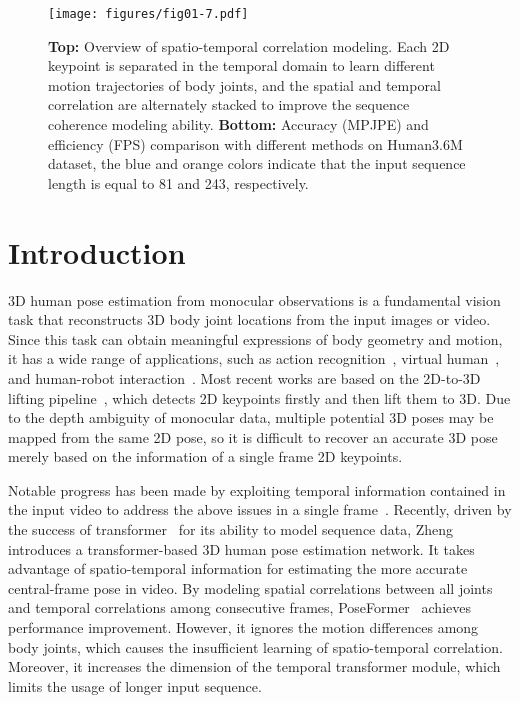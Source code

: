\documentclass[10pt,twocolumn,letterpaper]{article}
\begin{document}
	\begin{figure}[htp]
		\centering
\texttt{[image: figures/fig01-7.pdf]}
		\vspace{-0.6cm}
		\caption{
			\textbf{Top:} Overview of spatio-temporal correlation modeling. Each 2D keypoint is separated in the temporal domain to learn different motion trajectories of body joints, and the spatial and temporal correlation are alternately stacked to improve the sequence coherence modeling ability.
			\textbf{Bottom:} Accuracy (MPJPE) and efficiency (FPS) comparison with different methods on Human3.6M dataset, the blue and orange colors indicate that the input sequence length  is equal to 81 and 243, respectively.
		}
		\label{fig:01}
\end{figure}
	
\section{Introduction}
	\label{sec:intro}
3D human pose estimation from monocular observations is a fundamental vision task that reconstructs 3D body joint locations from the input images or video.
	Since this task can obtain meaningful expressions of body geometry and motion, it has a wide range of applications, such as action recognition~\cite{weng2022action,zhang2020spatial}, virtual human~\cite{Yoon_2021_CVPR,chen2019so,chen2021joint, chen2021model}, and human-robot interaction~\cite{5152690,yemang,gong2022meta}.
	Most recent works are based on the 2D-to-3D lifting pipeline~\cite{simplebaseline,motionguidepose,cai2019exploiting,videopose3d,poseformer,attentionmechanism,anatomypose}, which detects 2D keypoints firstly and then lift them to 3D.
	Due to the depth ambiguity of monocular data, multiple potential 3D poses may be mapped from the same 2D pose, so it is difficult to recover an accurate 3D pose merely based on the information of a single frame 2D keypoints.
	
Notable progress has been made by exploiting temporal information contained in the input video to address the above issues in a single frame~\cite{temporalconsis,videopose3d,attentionmechanism,anatomypose,motionguidepose,cai2019exploiting}.
	Recently, driven by the success of transformer~\cite{attisalluneed} for its ability to model sequence data, Zheng \etal~\cite{poseformer} introduces a transformer-based 3D human pose estimation network. 
	It takes advantage of spatio-temporal information for estimating the more accurate central-frame pose in video. 
	By modeling spatial correlations between all joints and temporal correlations among consecutive frames, PoseFormer~\cite{poseformer} achieves performance improvement.
	However, it ignores the motion differences among body joints, which causes the insufficient learning of spatio-temporal correlation.
	Moreover, it increases the dimension of the temporal transformer module, which limits the usage of longer input sequence.
	
\end{document}
